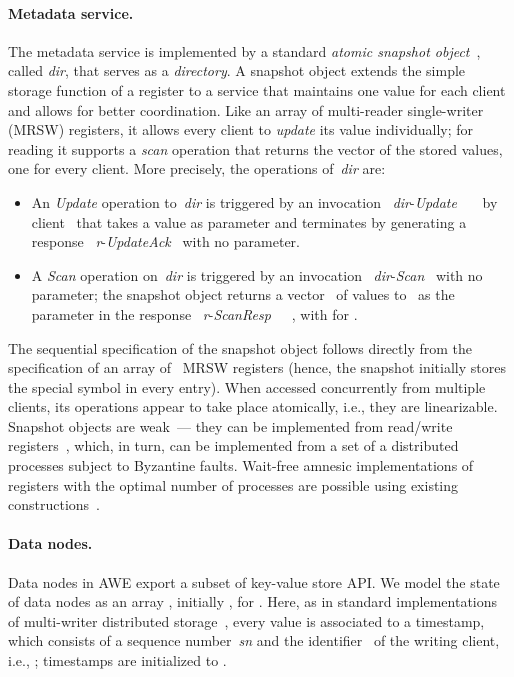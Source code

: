 \documentclass[oribibl]{llncs}
\theoremstyle{definition-boldhead}
\newcommand{\var}[1]{\textit{#1}}
\newcommand{\event}[2]{~{\var{#1}}-\textsl{#2}~}
\newcommand{\eventt}[3]{~{\var{#1}}-\textsl{#2}~~{#3}~}
\newcommand{\dir}{\var{dir}\xspace}
\newcommand{\NAME}{AWE\xspace}
\newcommand{\nodes}{nodes\xspace}
\begin{document}
\paragraph{Metadata service.}
The metadata service is implemented by a standard \emph{atomic
  snapshot object}~\cite{aadgms93}, called \dir, that serves as a
\emph{directory}.  A snapshot object extends the simple storage
function of a register to a service that maintains one value for each
client and allows for better coordination.  Like an array of
multi-reader single-writer (MRSW) registers, it allows every client to
\emph{update} its value individually; for reading it supports a
\emph{scan} operation that returns the vector of the stored values,
one for every client.  More precisely, the operations of~\dir are:
\begin{itemize}
\item An \emph{Update} operation to~\dir is triggered by an invocation
  \eventt{dir}{Update}{} by client~ that takes a value  as parameter and terminates by generating a response
  \event{r}{UpdateAck} with no parameter.
\item A \emph{Scan} operation on~\dir is triggered by an invocation
  \event{dir}{Scan} with no parameter; the snapshot object returns a
  vector~ of  values to~ as the parameter in
  the response \eventt{r}{ScanResp}{}, with  for
  .
\end{itemize}
The sequential specification of the snapshot object follows directly
from the specification of an array of ~MRSW registers
(hence, the snapshot initially stores the special symbol  in every entry).  When accessed concurrently from multiple
clients, its operations appear to take place atomically, i.e., they
are linearizable.  Snapshot objects are weak~--- they can be
implemented from read/write registers~\cite{aadgms93}, which, in turn,
can be implemented from a set of a distributed processes subject to
Byzantine faults.  Wait-free amnesic implementations of registers with
the optimal number of  processes are possible using existing
constructions~\cite{gulevu06,domasu08}.


\if\submit\yes
\paragraph{Data \nodes.}

Data \nodes in \NAME export a subset of key-value store API. We model the state of data nodes as an array , initially , for .  Here, as
in standard implementations of multi-writer distributed
storage~\cite{CachinGR11}, every value is associated to a timestamp,
which consists of a sequence number~\var{sn} and the identifier~ of the writing client, i.e., ; timestamps
are initialized to .
\end{document}
